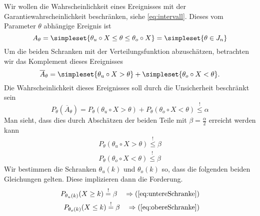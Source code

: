 Wir wollen die Wahrscheinlichkeit eines Ereignisses mit der Garantiewahrscheinlichkeit beschränken, siehe \autoref{eq:intervall}. Dieses vom Parameter $\theta$ abhängige Ereignis ist
\begin{equation*}
	A_\theta = \simpleset{\theta_u\circ X\leq \theta\leq \theta_o\circ X} = \simpleset{\theta\in J_n}
\end{equation*}
Um die beiden Schranken mit der Verteilungsfunktion abzuschätzen, betrachten wir das Komplement dieses Ereignisses
\begin{equation*}
	\overline A_\theta =\simpleset{\theta_u\circ X > \theta}+\simpleset{\theta_o\circ X< \theta}.
\end{equation*}
Die Wahrscheinlichkeit dieses Ereignisses soll durch die Unsicherheit beschränkt sein
\begin{equation*}
	P_\theta(\overline A_\theta) = P_\theta(\theta_u\circ X > \theta)+P_\theta(\theta_o\circ X< \theta)\overset!\leq\alpha
\end{equation*}
Man sieht, dass dies durch Abschätzen der beiden Teile mit $\beta=\frac\alpha2$ erreicht werden kann
\begin{align}
	P_\theta(\theta_u\circ X > \theta)\overset!\leq \beta \label{eq:untereSchranke}\\
	P_\theta(\theta_o\circ X< \theta)\overset!\leq\beta \label{eq:obereSchranke}
\end{align}
Wir bestimmen die Schranken $\theta_u(k)$ und $\theta_o(k)$ so, dass die folgenden beiden Gleichungen gelten. Diese implizieren dann die Forderung.
\begin{align*}
	P_{\theta_u(k)}(X\geq k)\overset!=\beta\quad\Rightarrow (\ref{eq:untereSchranke})\\
	P_{\theta_o(k)}(X\leq k)\overset!=\beta\quad\Rightarrow (\ref{eq:obereSchranke})
\end{align*}




